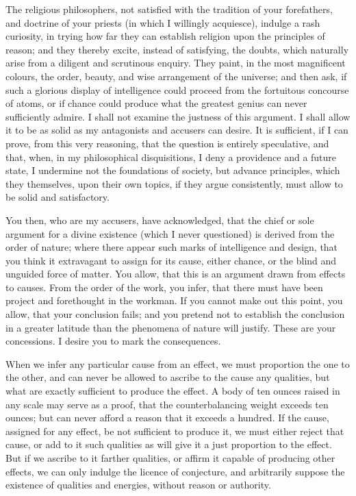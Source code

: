 \documentclass[]{article}
\begin{document}
\begin{sectionbody}
\humeparagraph  The religious philosophers, not satisfied with the tradition of your forefathers, and doctrine of your priests (in which I willingly acquiesce), indulge a rash curiosity, in trying how far they can establish religion upon the principles of reason; and they thereby excite, instead of satisfying, the doubts, which naturally arise from a diligent and scrutinous enquiry. They paint, in the most magnificent colours, the order, beauty, and wise arrangement of the universe; and then ask, if such a glorious display of intelligence could proceed from the fortuitous concourse of atoms, or if chance could produce what the greatest genius can never sufficiently admire. I shall not examine the justness of this argument. I shall allow it to be as solid as my antagonists and accusers can desire. It is sufficient, if I can prove, from this very reasoning, that the question is entirely speculative, and that, when, in my philosophical disquisitions, I deny a providence and a future state, I undermine not the foundations of society, but advance principles, which they themselves, upon their own topics, if they argue consistently, must allow to be solid and satisfactory.

\humeparagraph  You then, who are my accusers, have acknowledged, that the chief or sole argument for a divine existence (which I never questioned) is derived from the order of nature; where there appear such marks of intelligence and design, that you think it extravagant to assign for its cause, either chance, or the blind and unguided force of matter. You allow, that this is an argument drawn from effects to causes. From the order of the work, you infer, that there must have been project and forethought in the workman. If you cannot make out this point, you allow, that your conclusion fails; and you pretend not to establish the conclusion in a greater latitude than the phenomena of nature will justify. These are your concessions. I desire you to mark the consequences.

\humeparagraph  When we infer any particular cause from an effect, we must proportion the one to the other, and can never be allowed to ascribe to the cause any qualities, but what are exactly sufficient to produce the effect. A body of ten ounces raised in any scale may serve as a proof, that the counterbalancing weight exceeds ten ounces; but can never afford a reason that it exceeds a hundred. If the cause, assigned for any effect, be not sufficient to produce it, we must either reject that cause, or add to it such qualities as will give it a just proportion to the effect. But if we ascribe to it farther qualities, or affirm it capable of producing other effects, we can only indulge the licence of conjecture, and arbitrarily suppose the existence of qualities and energies, without reason or authority.


\end{sectionbody}
\end{document}
